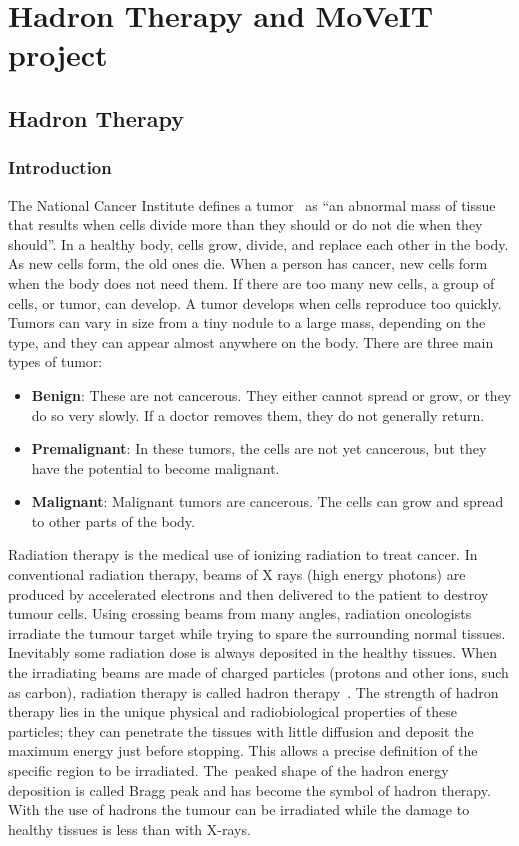 \part{Hadron Therapy and MoVeIT project}
\pagestyle{fancy}
\chapter{Hadron Therapy}

\section{Introduction}
The National Cancer Institute defines a tumor~\cite{tumor} as “an abnormal mass of tissue that results when cells divide more than they should or do not die when they should”.
In a healthy body, cells grow, divide, and replace each other in the body. As new cells form, the old ones die. When a person has cancer, new cells form when the body does not need them. If there are too many new cells, a group of cells, or tumor, can develop.
A tumor develops when cells reproduce too quickly. Tumors can vary in size from a tiny nodule to a large mass, depending on the type, and they can appear almost anywhere on the body.
There are three main types of tumor:
\begin{itemize}
\item \textbf{Benign}: These are not cancerous. They either cannot spread or grow, or they do so very slowly. If a doctor removes them, they do not generally return.
\item \textbf{Premalignant}: In these tumors, the cells are not yet cancerous, but they have the potential to become malignant.
\item \textbf{Malignant}: Malignant tumors are cancerous. The cells can grow and spread to other parts of the body.
\end{itemize}
Radiation therapy is the medical use of ionizing radiation to treat cancer. In conventional radiation therapy, beams of X rays (high energy photons) are produced by accelerated electrons and then delivered to the patient to destroy tumour cells. Using crossing beams from many angles, radiation oncologists irradiate the tumour target while trying to spare the surrounding normal tissues. Inevitably some radiation dose is always deposited in the healthy tissues.
When the irradiating beams are made of charged particles (protons and other ions, such as carbon), radiation therapy is called hadron therapy~\cite{radiationtherapy}. The strength of hadron therapy lies in the unique physical and radiobiological properties of these particles; they can penetrate the tissues with little diffusion and deposit the maximum energy just before stopping. This allows a precise definition of the specific region to be irradiated. The~peaked shape of the hadron energy deposition is called Bragg peak and has become the symbol of hadron therapy. With the use of hadrons the tumour can be irradiated while the damage to healthy tissues is less than with X-rays.

